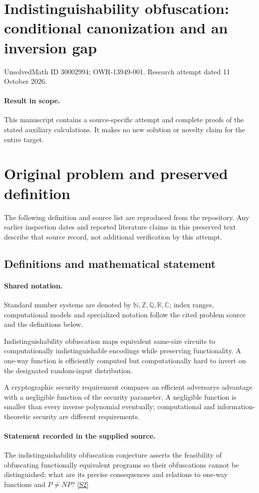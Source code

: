 \documentclass[11pt]{article}
\begin{document}
\section*{Indistinguishability obfuscation: conditional canonization and an inversion gap}
\noindent UnsolvedMath ID 30002994; OWR-13949-001. Research attempt dated 11 October 2026.
\paragraph{Result in scope.}This manuscript contains a source-specific attempt and complete proofs of the stated auxiliary calculations. It makes no new solution or novelty claim for the entire target.
\section{Original problem and preserved definition}
The following definition and source list are reproduced from the repository. Any earlier inspection dates and reported literature claims in this preserved text describe that source record, not additional verification by this attempt.
\subsection{Definitions and mathematical statement}

\paragraph{Shared notation.}Standard number systems are denoted by $\mathbb N,\mathbb Z,\mathbb Q,\mathbb R,\mathbb C$; index ranges, computational models and specialized notation follow the cited problem source and the definitions below.


Indistinguishability obfuscation maps equivalent same-size circuits to computationally indistinguishable encodings while preserving functionality. A one-way function is efficiently computed but computationally hard to invert on the designated random-input distribution.

A cryptographic security requirement compares an efficient adversary\textquotesingle s advantage with a negligible function of the security parameter. A negligible function is smaller than every inverse polynomial eventually; computational and information-theoretic security are different requirements.
\paragraph{Statement recorded in the supplied source.}
The indistinguishability obfuscation conjecture asserts the feasibility of obfuscating functionally equivalent programs so their obfuscations cannot be distinguished; what are its precise consequences and relations to one-way functions and $P\neq NP$? \href{https://doi.org/10.4171/owr/2015/54}{[S2]}
\end{document}
